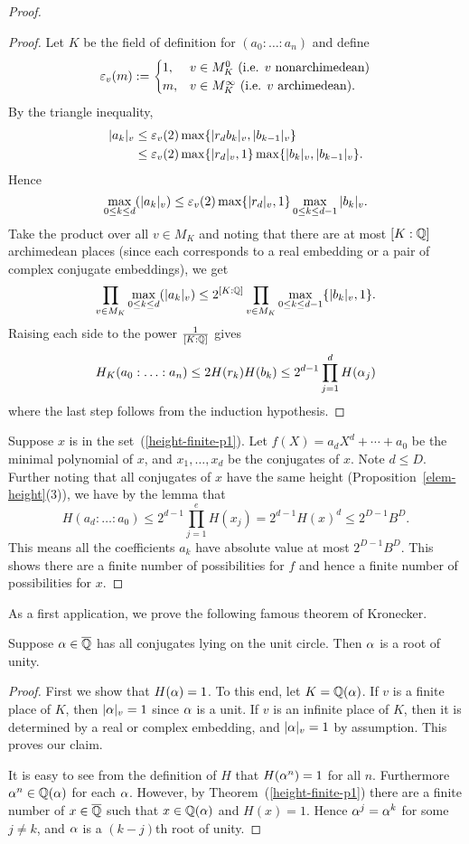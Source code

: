 \begin{proof}
\begin{proof}
Let $K$ be the field of definition for $(a_0:\ldots:a_n)$ and define
\begin{equation}\label{epv}
\varepsilon_v(m):=\begin{cases} 1,&v\in M_K^{0}\text{ (i.e. $v$ nonarchimedean)}\\
m,&v\in M_K^{\infty}\text{ (i.e. $v$ archimedean)}.\end{cases}
\end{equation}
By the triangle inequality,
\begin{align*}
|a_k|_v&\le \varepsilon_v(2)\max\{|r_db_k|_v ,|b_{k-1}|_v\}\\
&\le \varepsilon_v(2)\max\{|r_d|_v,1\}\max\{|b_k|_v,|b_{k-1}|_{v}\}.
\end{align*}
Hence
\[
\max_{0\le k\le d}(|a_k|_v)\le \varepsilon_v(2)\max\{|r_d|_v,1\}\max_{0\le k\le d-1}|b_k|_v.
\]
Take the product over all $v\in M_K$ and noting that there are at most $[K:\mathbb{Q}]$ archimedean places (since each corresponds to a real embedding or a pair of complex conjugate embeddings), we get
\[
\prod_{v\in M_K}\max_{0\le k\le d}(|a_k|_v) \le 2^{[K:\mathbb{Q}]} \prod_{v\in M_K} \max_{0\le k\le d-1}\{|b_k|_v,1\}.
\]
Raising each side to the power $\frac{1}{[K:\mathbb{Q}]}$ gives
\[
H_K(a_0:\ldots:a_n)%
\le 2H(r_k)H(b_k)\le 2^{d-1}\prod_{j=1}^d H(\al_j)
\]
where the last step follows from the induction hypothesis.
\end{proof}
Suppose $x$ is in the set~(\ref{height-finite-p1}). 
Let $f(X)=a_dX^d+\cdots +a_0$ be the minimal polynomial of $x$, and $x_1,\ldots, x_d$ be the conjugates of $x$. Note $d\le D$. Further noting that all conjugates of $x$ have the same height (Proposition~\ref{elem-height}(3)), we have by the lemma that 
\[
H(a_d:\ldots:a_0)\le 2^{d-1}\prod_{j=1}^e H(x_j)=2^{d-1}H(x)^d\le 2^{D-1}B^D.
\]
This means all the coefficients $a_k$ have absolute value at most $2^{D-1}B^D$. This shows there are a finite number of possibilities for $f$ and hence a finite number of possibilities for $x$.
\end{proof}
As a first application, we prove the following famous theorem of Kronecker.
\begin{thm}[Kronecker]\label{kronecker-conj-unit-circ}
Suppose $\alpha\in \overline{\mathbb{Q}}$ has all conjugates lying on the unit circle. Then $\alpha$ is a root of unity.
\end{thm}
\begin{proof}
First we show that $H(\alpha)=1$. To this end, let $K=\mathbb{Q}(\alpha)$. If $v$ is a finite place of $K$, then $|\alpha|_v=1$ since $\alpha$ is a unit. If $v$ is an infinite place of $K$, then it is determined by a real or complex embedding, and $|\alpha|_v=1$ by assumption. This proves our claim.

It is easy to see from the definition of $H$ that $H(\alpha^n)=1$ for all $n$. Furthermore $\alpha^n\in \mathbb{Q}(\alpha)$ for each $\alpha$. 
However, by Theorem~(\ref{height-finite-p1}) there are a finite number of $x\in \overline{\mathbb{Q}}$ such that $x\in \mathbb{Q}(\alpha)$ and $H(x)=1$. Hence $\alpha^j=\alpha^k$ for some $j\ne k$, and $\alpha$ is a $(k-j)$th root of unity.
\end{proof}
